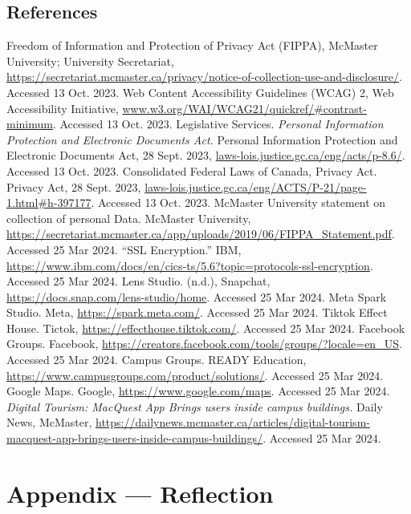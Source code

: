 \documentclass[12pt]{article}
\begin{document}
\subsection{References}
\begin{thebibliography}{9}
   Freedom of Information and Protection of Privacy Act (FIPPA), McMaster University; University Secretariat, \url{https://secretariat.mcmaster.ca/privacy/notice-of-collection-use-and-disclosure/}. Accessed 13 Oct. 2023. 
   Web Content Accessibility Guidelines (WCAG) 2, Web Accessibility Initiative, \url{www.w3.org/WAI/WCAG21/quickref/#contrast-minimum}. Accessed 13 Oct. 2023. 
   Legislative Services. \textit{Personal Information Protection and Electronic Documents Act.} Personal Information Protection and Electronic Documents Act, 28 Sept. 2023, \url{laws-lois.justice.gc.ca/eng/acts/p-8.6/}.  Accessed 13 Oct. 2023. 
   Consolidated Federal Laws of Canada, Privacy Act. Privacy Act, 28 Sept. 2023, \url{laws-lois.justice.gc.ca/eng/ACTS/P-21/page-1.html#h-397177}.  Accessed 13 Oct. 2023. 
   McMaster University statement on collection of personal Data. McMaster University, \url{https://secretariat.mcmaster.ca/app/uploads/2019/06/FIPPA_Statement.pdf}.  Accessed 25 Mar 2024. 
   ``SSL Encryption.'' IBM, \url{https://www.ibm.com/docs/en/cics-ts/5.6?topic=protocols-ssl-encryption}. Accessed 25 Mar 2024. 
   Lens Studio. (n.d.),  Snapchat, \url{https://docs.snap.com/lens-studio/home}. Accessed 25 Mar 2024. 
   Meta Spark Studio. Meta, \url{https://spark.meta.com/}. Accessed 25 Mar 2024. 
   Tiktok Effect House. Tictok, \url{https://effecthouse.tiktok.com/}. Accessed 25 Mar 2024. 
   Facebook Groups. Facebook, \url{https://creators.facebook.com/tools/groups/?locale=en_US}. Accessed 25 Mar 2024. 
   Campus Groups. READY Education, \url{https://www.campusgroups.com/product/solutions/}. Accessed 25 Mar 2024. 
   Google Maps. Google, \url{https://www.google.com/maps}. Accessed 25 Mar 2024. 
   \textit{Digital Tourism: MacQuest App Brings users inside campus buildings. } Daily News, McMaster, \url{https://dailynews.mcmaster.ca/articles/digital-tourism-macquest-app-brings-users-inside-campus-buildings/}. Accessed 25 Mar 2024. 
\end{thebibliography}

\newpage{}
\section*{Appendix --- Reflection}
\end{document}
